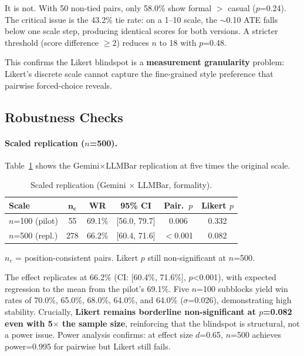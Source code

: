 \documentclass[11pt,a4paper]{article}
\begin{document}
It is not.
With 50 non-tied pairs, only 58.0\% show formal $>$ casual ($p$=0.24).
The critical issue is the 43.2\% tie rate: on a 1--10 scale, the $\sim$0.10 ATE falls below one scale step, producing identical scores for both versions.
A stricter threshold (score difference $\geq$2) reduces $n$ to 18 with $p$=0.48.

This confirms the Likert blindspot is a \textbf{measurement granularity} problem: Likert's discrete scale cannot capture the fine-grained style preference that pairwise forced-choice reveals.

\subsection{Robustness Checks}

\paragraph{Scaled replication ($n$=500).}
Table~\ref{tab:n500} shows the Gemini$\times$LLMBar replication at five times the original scale.

\begin{table}[t]
\centering
\small
\caption{Scaled replication (Gemini $\times$ LLMBar, formality).}
\label{tab:n500}
\begin{tabular}{lccccc}
\toprule
\textbf{Scale} & $\bm{n_c}$ & \textbf{WR} & \textbf{95\% CI} & \textbf{Pair.\ $p$} & \textbf{Likert $p$} \\
\midrule
$n$=100 (pilot) & 55 & 69.1\% & [56.0, 79.7] & 0.006 & 0.332 \\
$n$=500 (repl.) & 278 & 66.2\% & [60.4, 71.6] & $<$0.001 & 0.082 \\
\bottomrule
\end{tabular}
\begin{flushleft}
\footnotesize $n_c$ = position-consistent pairs. Likert $p$ still non-significant at $n$=500.
\end{flushleft}
\end{table}

The effect replicates at 66.2\% (CI: [60.4\%, 71.6\%], $p$<0.001), with expected regression to the mean from the pilot's 69.1\%.
Five $n$=100 subblocks yield win rates of 70.0\%, 65.0\%, 68.0\%, 64.0\%, and 64.0\% ($\sigma$=0.026), demonstrating high stability.
Crucially, \textbf{Likert remains borderline non-significant at $p$=0.082 even with 5$\times$ the sample size}, reinforcing that the blindspot is structural, not a power issue.
Power analysis confirms: at effect size $d$=0.65, $n$=500 achieves power=0.995 for pairwise but Likert still fails.
\end{document}
